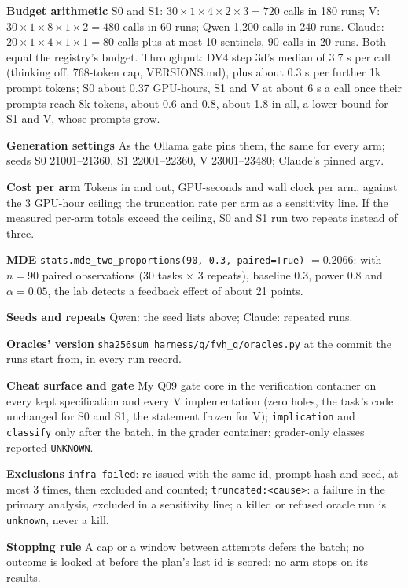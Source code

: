 \documentclass[11pt]{article}
\begin{document}
\begin{answer}
\textbf{Budget arithmetic} S0 and S1: $30 \times 1 \times 4 \times 2 \times 3
= 720$ calls in 180 runs; V: $30 \times 1 \times 8 \times 1 \times 2 = 480$
calls in 60 runs; Qwen 1,200 calls in 240 runs. Claude: $20 \times 1 \times 4
\times 1 \times 1 = 80$ calls plus at most 10 sentinels, 90 calls in 20 runs.
Both equal the registry's budget. Throughput: DV4 step 3d's median of 3.7 s per
call (thinking off, 768-token cap, VERSIONS.md), plus about 0.3 s per further
1k prompt tokens; S0 about 0.37 GPU-hours, S1 and V at about 6 s a call once
their prompts reach 8k tokens, about 0.6 and 0.8, about 1.8 in all, a lower
bound for S1 and V, whose prompts grow.

\textbf{Generation settings} As the Ollama gate pins them, the same for every
arm; seeds S0 21001--21360, S1 22001--22360, V 23001--23480; Claude's pinned
argv.

\textbf{Cost per arm} Tokens in and out, GPU-seconds and wall clock per arm,
against the 3 GPU-hour ceiling; the truncation rate per arm as a sensitivity
line. If the measured per-arm totals exceed the ceiling, S0 and S1 run two
repeats instead of three.

\textbf{MDE} \texttt{stats.mde\_two\_proportions(90, 0.3, paired=True)}
$= 0.2066$: with $n = 90$ paired observations (30 tasks $\times$ 3 repeats),
baseline 0.3, power 0.8 and $\alpha = 0.05$, the lab detects a feedback effect
of about 21 points.

\textbf{Seeds and repeats} Qwen: the seed lists above; Claude: repeated runs.

\textbf{Oracles' version} \texttt{sha256sum harness/q/fvh\_q/oracles.py} at
the commit the runs start from, in every run record.

\textbf{Cheat surface and gate} My Q09 gate core in the verification container
on every kept specification and every V implementation (zero holes, the task's
code unchanged for S0 and S1, the statement frozen for V); \texttt{implication}
and \texttt{classify} only after the batch, in the grader container;
grader-only classes reported \texttt{UNKNOWN}.

\textbf{Exclusions} \texttt{infra-failed}: re-issued with the same id, prompt
hash and seed, at most 3 times, then excluded and counted;
\texttt{truncated:<cause>}: a failure in the primary analysis, excluded in a
sensitivity line; a killed or refused oracle run is \texttt{unknown}, never a
kill.

\textbf{Stopping rule} A cap or a window between attempts defers the batch; no
outcome is looked at before the plan's last id is scored; no arm stops on its
results.


\end{answer}
\end{document}
